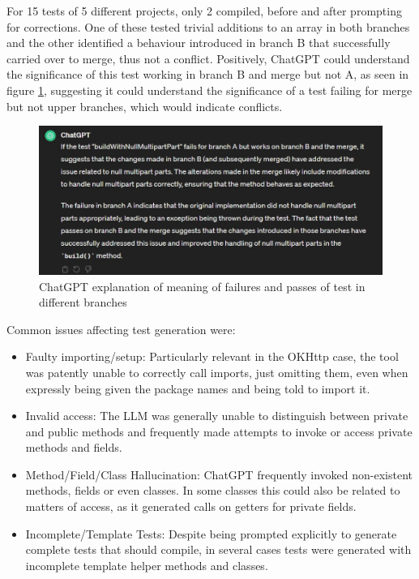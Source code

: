 For 15 tests of 5 different projects, only 2 compiled, before and after prompting for corrections. One of these tested trivial additions to an array in both branches and the other identified a behaviour introduced in branch B that successfully carried over to merge, thus not a conflict. Positively, ChatGPT could understand the significance of this test working in branch B and merge but not A, as seen in figure \ref{fig:testexplain}, suggesting it could understand the significance of a test failing for merge but not upper branches, which would indicate conflicts.

\begin{figure}
    \centering
    \includegraphics[width=1\linewidth]{figures/testexplain.jpg}
    \caption{ChatGPT explanation of meaning of failures and passes of test in different branches}
    \label{fig:testexplain}
\end{figure}

Common issues affecting test generation were:

\begin{itemize}
  \item Faulty importing/setup: Particularly relevant in the OKHttp case, the tool was patently unable to correctly call imports, just omitting them, even when expressly being given the package names and being told to import it.
  \item Invalid access: The LLM was generally unable to distinguish between private and public methods and frequently made attempts to invoke or access private methods and fields.
  \item Method/Field/Class Hallucination: ChatGPT frequently invoked non-existent methods, fields or even classes. In some classes this could also be related to matters of access, as it generated calls on getters for private fields.
  \item Incomplete/Template Tests: Despite being prompted explicitly to generate complete tests that should compile, in several cases tests were generated with incomplete template helper methods and classes.
\end{itemize}


